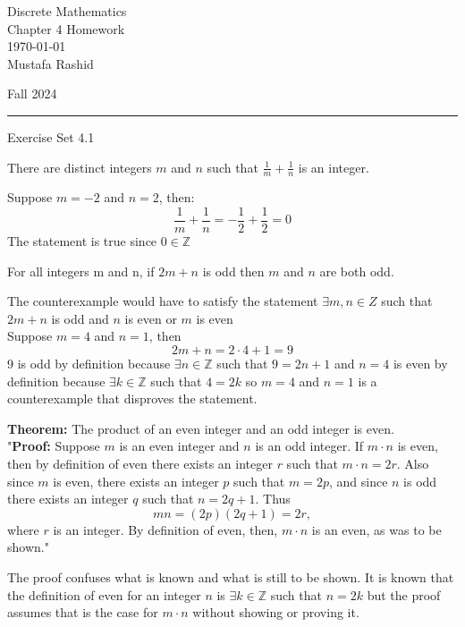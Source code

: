 \documentclass[12pt,letterpaper, onecolumn]{exam}
\begin{document}
	
	\begingroup  
	\noindent\LARGE Discrete Mathematics\\
	\noindent\LARGE Chapter 4 Homework\\
	\noindent\large \today\\
	\noindent\large Mustafa Rashid\par
	\noindent\large Fall 2024\par
	\endgroup
	\rule{\textwidth}{0.4pt}
	\pointsdroppedatright
	\printanswers
	\renewcommand{\solutiontitle}{\noindent\textbf{Ans:}\enspace}  
	
	\centering\large Exercise Set 4.1\\
	\begin{questions}
		\setcounter{question}{4} \question  There are distinct integers $m$ and $n$ such that $\frac{1}{m}+\frac{1}{n}$ is an integer.
		
		\begin{solution}
			 Suppose $m=-2$ and $n=2$, then:
			 $$\frac{1}{m}+\frac{1}{n} = -\frac{1}{2}+\frac{1}{2}=0$$
			 The statement is true since $0 \in \mathbb{Z}$
		\end{solution}
		
		\setcounter{question}{12} \question For all integers m and n, if $2m+n$ is odd then $m$ and $n$ are both odd.
		
	 \begin{solution}
	 	The counterexample would have to satisfy the statement $\exists m,n \in Z$ such that $2m+n$ is odd and $n$ is even or $m$ is even\\
	 	Suppose $m=4$ and $n=1$, then
	 	$$2m+n = 2\cdot4 + 1 = 9$$
	 	9 is odd by definition because $\exists n \in \mathbb{Z}$ such that $9=2n+1$ and $n=4$ is even by definition because $\exists k \in \mathbb{Z}$ such that $4=2k$ so $m=4$ and $n=1$ is a counterexample that disproves the statement.
	 \end{solution}
		
		\setcounter{question}{40} \question \textbf{Theorem:} The product of an even integer and an odd integer is even.\\
		"\textbf{Proof:} Suppose $m$ is an even integer and $n$ is an odd integer. If $m\cdot n$ is even, then by definition of even there exists an integer $r$ such that $m\cdot n = 2r$. Also since $m$ is even, there exists an integer $p$ such that $m=2p$, and since $n$ is odd there exists an integer $q$ such that $n=2q+1$. Thus $$mn = (2p)(2q+1) = 2r,$$ where $r$ is an integer. By definition of even, then, $m\cdot n$ is an even, as was to be shown."
		\begin{solution}
			The proof confuses what is known and what is still to be shown. It is known that the definition of even for an integer $n$ is $\exists k \in \mathbb{Z}$ such that $n=2k$ but the proof assumes that is the case for $m\cdot n$ without showing or proving it.
		\end{solution}
		

\end{questions}
\end{document}
